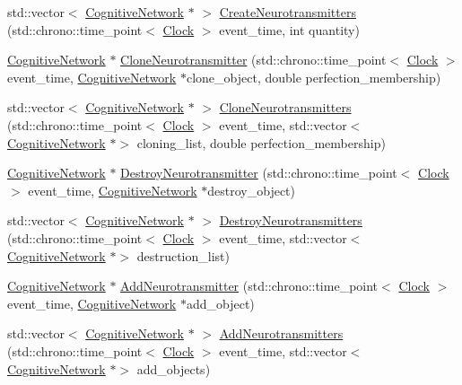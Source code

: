 \begin{DoxyCompactItemize}
\item 
std\+::vector$<$ \hyperlink{class_cognitive_network}{Cognitive\+Network} $\ast$ $>$ \hyperlink{class_synapse_a593c70925fb80b880c6a01f2f252eb22}{Create\+Neurotransmitters} (std\+::chrono\+::time\+\_\+point$<$ \hyperlink{universe_8h_a0ef8d951d1ca5ab3cfaf7ab4c7a6fd80}{Clock} $>$ event\+\_\+time, int quantity)
\item 
\hyperlink{class_cognitive_network}{Cognitive\+Network} $\ast$ \hyperlink{class_synapse_a1b52aa12cc7c28bfa2564e21ac17eb07}{Clone\+Neurotransmitter} (std\+::chrono\+::time\+\_\+point$<$ \hyperlink{universe_8h_a0ef8d951d1ca5ab3cfaf7ab4c7a6fd80}{Clock} $>$ event\+\_\+time, \hyperlink{class_cognitive_network}{Cognitive\+Network} $\ast$clone\+\_\+object, double perfection\+\_\+membership)
\item 
std\+::vector$<$ \hyperlink{class_cognitive_network}{Cognitive\+Network} $\ast$ $>$ \hyperlink{class_synapse_a97c0db103754d337e28591f185c8379f}{Clone\+Neurotransmitters} (std\+::chrono\+::time\+\_\+point$<$ \hyperlink{universe_8h_a0ef8d951d1ca5ab3cfaf7ab4c7a6fd80}{Clock} $>$ event\+\_\+time, std\+::vector$<$ \hyperlink{class_cognitive_network}{Cognitive\+Network} $\ast$$>$ cloning\+\_\+list, double perfection\+\_\+membership)
\item 
\hyperlink{class_cognitive_network}{Cognitive\+Network} $\ast$ \hyperlink{class_synapse_a8d53488bdd8f0bd97216e5d388df35b8}{Destroy\+Neurotransmitter} (std\+::chrono\+::time\+\_\+point$<$ \hyperlink{universe_8h_a0ef8d951d1ca5ab3cfaf7ab4c7a6fd80}{Clock} $>$ event\+\_\+time, \hyperlink{class_cognitive_network}{Cognitive\+Network} $\ast$destroy\+\_\+object)
\item 
std\+::vector$<$ \hyperlink{class_cognitive_network}{Cognitive\+Network} $\ast$ $>$ \hyperlink{class_synapse_a58c882f356bc34c66a7cd2b345532ec9}{Destroy\+Neurotransmitters} (std\+::chrono\+::time\+\_\+point$<$ \hyperlink{universe_8h_a0ef8d951d1ca5ab3cfaf7ab4c7a6fd80}{Clock} $>$ event\+\_\+time, std\+::vector$<$ \hyperlink{class_cognitive_network}{Cognitive\+Network} $\ast$$>$ destruction\+\_\+list)
\item 
\hyperlink{class_cognitive_network}{Cognitive\+Network} $\ast$ \hyperlink{class_synapse_a76b96e3f71f9e7b0ba6b80166c3883f7}{Add\+Neurotransmitter} (std\+::chrono\+::time\+\_\+point$<$ \hyperlink{universe_8h_a0ef8d951d1ca5ab3cfaf7ab4c7a6fd80}{Clock} $>$ event\+\_\+time, \hyperlink{class_cognitive_network}{Cognitive\+Network} $\ast$add\+\_\+object)
\item 
std\+::vector$<$ \hyperlink{class_cognitive_network}{Cognitive\+Network} $\ast$ $>$ \hyperlink{class_synapse_a5ad01cc92c00d790b44472156065786e}{Add\+Neurotransmitters} (std\+::chrono\+::time\+\_\+point$<$ \hyperlink{universe_8h_a0ef8d951d1ca5ab3cfaf7ab4c7a6fd80}{Clock} $>$ event\+\_\+time, std\+::vector$<$ \hyperlink{class_cognitive_network}{Cognitive\+Network} $\ast$$>$ add\+\_\+objects)
$$
\end{DoxyCompactItemize}
